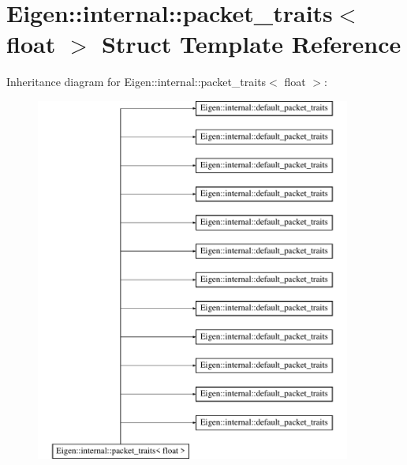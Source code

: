 \hypertarget{struct_eigen_1_1internal_1_1packet__traits_3_01float_01_4}{}\section{Eigen\+:\+:internal\+:\+:packet\+\_\+traits$<$ float $>$ Struct Template Reference}
\label{struct_eigen_1_1internal_1_1packet__traits_3_01float_01_4}
Inheritance diagram for Eigen\+:\+:internal\+:\+:packet\+\_\+traits$<$ float $>$\+:\begin{figure}[H]
\begin{center}
\leavevmode
\includegraphics[height=12.000000cm]{struct_eigen_1_1internal_1_1packet__traits_3_01float_01_4}
\end{center}
\end{figure}
